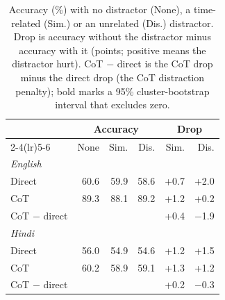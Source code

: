 \begin{table}[t]
\centering
\small
\setlength{\tabcolsep}{4pt}
\begin{tabular}{lrrrrr}
\toprule
 & \multicolumn{3}{c}{Accuracy} & \multicolumn{2}{c}{Drop} \\
\cmidrule(lr){2-4}\cmidrule(lr){5-6}
 & None & Sim. & Dis. & Sim. & Dis. \\
\midrule
\multicolumn{6}{l}{\textit{English}} \\
\quad Direct & 60.6 & 59.9 & 58.6 & +0.7 & +2.0 \\
\quad CoT & 89.3 & 88.1 & 89.2 & +1.2 & +0.2 \\
\quad CoT $-$ direct &  &  &  & +0.4 & $-$1.9 \\
\midrule
\multicolumn{6}{l}{\textit{Hindi}} \\
\quad Direct & 56.0 & 54.9 & 54.6 & +1.2 & +1.5 \\
\quad CoT & 60.2 & 58.9 & 59.1 & +1.3 & +1.2 \\
\quad CoT $-$ direct &  &  &  & +0.2 & $-$0.3 \\
\bottomrule
\end{tabular}
\caption{Accuracy (\%) with no distractor (None), a time-related (Sim.) or an unrelated (Dis.) distractor. Drop is accuracy without the distractor minus accuracy with it (points; positive means the distractor hurt). CoT $-$ direct is the CoT drop minus the direct drop (the CoT distraction penalty); bold marks a 95\% cluster-bootstrap interval that excludes zero.}
\label{tab:distractor}
\end{table}
